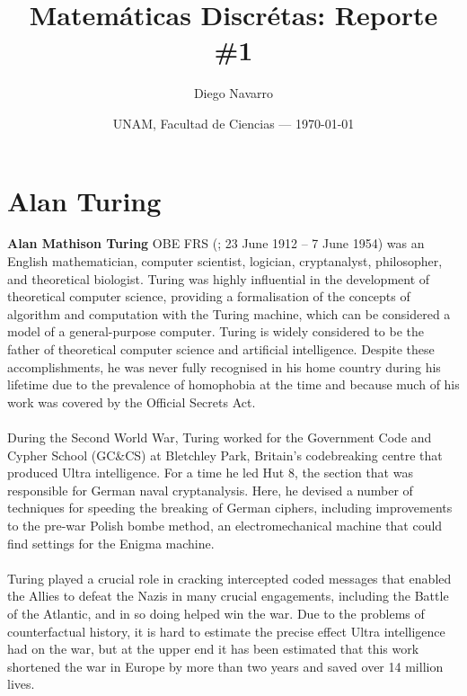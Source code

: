 \documentclass{article}
\title{Matem\'{a}ticas Discr\'{e}tas: Reporte \#1} %
\author{Diego Navarro}
\date{UNAM, Facultad de Ciencias --- \today}
\begin{document}
\maketitle


\section*{Alan Turing}

\textbf{Alan Mathison Turing} OBE FRS (; 23 June 1912 – 7 June 1954) was an English mathematician, computer scientist, logician, cryptanalyst, philosopher, and theoretical biologist. Turing was highly influential in the development of theoretical computer science, providing a formalisation of the concepts of algorithm and computation with the Turing machine, which can be considered a model of a general-purpose computer. Turing is widely considered to be the father of theoretical computer science and artificial intelligence. Despite these accomplishments, he was never fully recognised in his home country during his lifetime due to the prevalence of homophobia at the time and because much of his work was covered by the Official Secrets Act.\\
\\
During the Second World War, Turing worked for the Government Code and Cypher School (GC\&CS) at Bletchley Park, Britain's codebreaking centre that produced Ultra intelligence. For a time he led Hut 8, the section that was responsible for German naval cryptanalysis. Here, he devised a number of techniques for speeding the breaking of German ciphers, including improvements to the pre-war Polish bombe method, an electromechanical machine that could find settings for the Enigma machine.\\
\\
Turing played a crucial role in cracking intercepted coded messages that enabled the Allies to defeat the Nazis in many crucial engagements, including the Battle of the Atlantic, and in so doing helped win the war. Due to the problems of counterfactual history, it is hard to estimate the precise effect Ultra intelligence had on the war, but at the upper end it has been estimated that this work shortened the war in Europe by more than two years and saved over 14 million lives.\\
\end{document}
